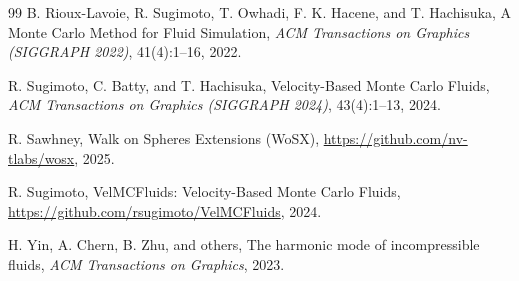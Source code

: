 \documentclass[12pt,a4paper]{article}
\begin{document}
\begin{thebibliography}{99}
B. Rioux-Lavoie, R. Sugimoto, T. Owhadi, F. K. Hacene, and T. Hachisuka,
\newblock A Monte Carlo Method for Fluid Simulation,
\newblock \emph{ACM Transactions on Graphics (SIGGRAPH 2022)}, 41(4):1--16, 2022.

R. Sugimoto, C. Batty, and T. Hachisuka,
\newblock Velocity-Based Monte Carlo Fluids,
\newblock \emph{ACM Transactions on Graphics (SIGGRAPH 2024)}, 43(4):1--13, 2024.

R. Sawhney,
\newblock Walk on Spheres Extensions (WoSX),
\newblock \url{https://github.com/nv-tlabs/wosx}, 2025.

R. Sugimoto,
\newblock VelMCFluids: Velocity-Based Monte Carlo Fluids,
\newblock \url{https://github.com/rsugimoto/VelMCFluids}, 2024.

H. Yin, A. Chern, B. Zhu, and others,
\newblock The harmonic mode of incompressible fluids,
\newblock \emph{ACM Transactions on Graphics}, 2023.
\end{thebibliography}
\end{document}

